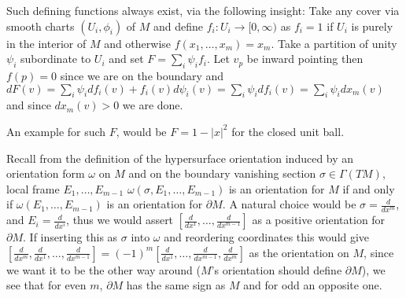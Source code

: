 Such defining functions always exist, via the following insight: Take any cover via smooth charts \( (U_i, \phi_i) \) of \( M \)
and define \( f_i : U_i \to [0, \infty) \) as \( f_i = 1 \) if \( U_i \) is purely in the interior of \( M \) and otherwise \( f(x_1, \dots, x_m) = x_m \).
Take a partition of unity \( \psi_i \) subordinate to \( U_i \) and set \( F = \sum_i \psi_i f_i \).
Let \( v_p \) be inward pointing then \( f(p) = 0 \) since we are on the boundary and
\( dF(v) = \sum_i \psi_i df_i(v) + f_i(v)d\psi_i(v) = \sum_i \psi_i df_i(v) = \sum_i \psi_i dx_m(v) \)
and since \( dx_m(v) > 0 \) we are done.

An example for such \( F \), would be \( F = 1 - |x|^2 \) for the closed unit ball.

Recall from the definition of the hypersurface orientation induced by an orientation form \( \omega \) on \( M \)
and on the boundary vanishing section \( \sigma \in \Gamma(TM) \), local frame \( E_1, \dots, E_{m-1} \)
\( \omega(\sigma, E_1, \dots, E_{m-1}) \) is an orientation for \( M \) if and only if \( \omega(E_1, \dots, E_{m-1}) \) is an orientation for \( \partial M \).
A natural choice would be \( \sigma = \frac{d}{dx^m} \), and \( E_i = \frac{d}{dx^i} \), thus we would assert \( [\frac{d}{dx^1}, \dots, \frac{d}{dx^{m-1}}] \)
as a positive orientation for \( \partial M \). If inserting this as \(\sigma\) into \( \omega \) and reordering coordinates this would give 
\( [\frac{d}{dx^m},\frac{d}{dx^1}, \dots, \frac{d}{dx^{m-1}}] = (-1)^m [\frac{d}{dx^1}, \dots, \frac{d}{dx^{m-1}}, \frac{d}{dx^m}]\) as the orientation on \( M \),
since we want it to be the other way around (\( M \)'s orientation should define \( \partial M \)), we see that for even \( m \), \( \partial M \) has the same sign
as \( M \) and for odd an opposite one.

